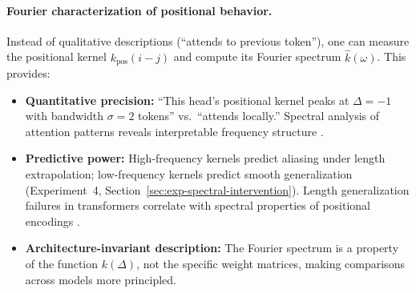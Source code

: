 \documentclass[11pt]{article}
\theoremstyle{definition}
\begin{document}
\paragraph{Fourier characterization of positional behavior.}
Instead of qualitative descriptions (``attends to previous token''), one can measure the positional kernel $k_{\text{pos}}(i-j)$ and compute its Fourier spectrum $\hat{k}(\omega)$. This provides:
\begin{itemize}
    \item \textbf{Quantitative precision:} ``This head's positional kernel peaks at $\Delta = -1$ with bandwidth $\sigma = 2$ tokens'' vs.\ ``attends locally.'' Spectral analysis of attention patterns reveals interpretable frequency structure \cite{bietti2024spectral,darcet2024visionfourier}.
    \item \textbf{Predictive power:} High-frequency kernels predict aliasing under length extrapolation; low-frequency kernels predict smooth generalization (Experiment~4, Section~\ref{sec:exp-spectral-intervention}). Length generalization failures in transformers correlate with spectral properties of positional encodings \cite{kazemnejad2024lengthgen}.
    \item \textbf{Architecture-invariant description:} The Fourier spectrum is a property of the function $k(\Delta)$, not the specific weight matrices, making comparisons across models more principled.
\end{itemize}
\end{document}
